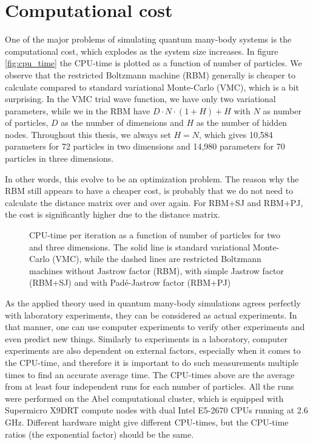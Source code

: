 \section{Computational cost}
One of the major problems of simulating quantum many-body systems is the computational cost, which explodes as the system size increases. In figure \eqref{fig:cpu_time} the CPU-time is plotted as a function of number of particles. We observe that the restricted Boltzmann machine (RBM) generally is cheaper to calculate compared to standard variational Monte-Carlo (VMC), which is a bit surprising. In the VMC trial wave function, we have only two variational parameters, while we in the RBM have $D\cdot N \cdot (1+H)+H$ with $N$ as number of particles, $D$ as the number of dimensions and $H$ as the number of hidden nodes. Throughout this thesis, we always set $H=N$, which gives 10,584 parameters for 72 particles in two dimensions and 14,980 parameters for 70 particles in three dimensions. 

In other words, this evolve to be an optimization problem. The reason why the RBM still appears to have a cheaper cost, is probably that we do not need to calculate the distance matrix over and over again. For RBM+SJ and RBM+PJ, the cost is significantly higher due to the distance matrix.

\begin{figure} %
	\centering
	
	\label{fig:cpu_time}
	\caption{CPU-time per iteration as a function of number of particles for two and three dimensions. The solid line is standard variational Monte-Carlo (VMC), while the dashed lines are restricted Boltzmann machines without Jastrow factor (RBM), with simple Jastrow factor (RBM+SJ) and with Padé-Jastrow factor (RBM+PJ)}
\end{figure}

As the applied theory used in quantum many-body simulations agrees perfectly with laboratory experiments, they can be considered as actual experiments. In that manner, one can use computer experiments to verify other experiments and even predict new things. Similarly to experiments in a laboratory, computer experiments are also dependent on external factors, especially when it comes to the CPU-time, and therefore it is important to do such measurements multiple times to find an accurate average time. The CPU-times above are the average from at least four independent runs for each number of particles. All the runs were performed on the Abel computational cluster, which is equipped with Supermicro X9DRT compute nodes with dual Intel E5-2670 CPUs running at 2.6 GHz. Different hardware might give different CPU-times, but the CPU-time ratios (the exponential factor) should be the same. 

